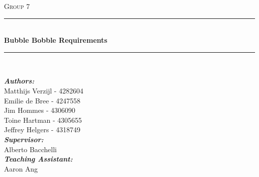\begin{titlepage}

\newcommand{\HRule}{\rule{\linewidth}{0.5mm}} %

\center %
 

\textsc{\LARGE Group 7}\\[1.5cm] %


\HRule \\[0.4cm]
{ \huge \bfseries Bubble Bobble Requirements}\\[0.4cm] %
\HRule \\[4cm]
 

\begin{minipage}{0.5\textwidth}
\begin{flushleft} \large
\textbf{\emph{Authors:}}\\     
Matthijs Verzijl - 4282604\\
Emilie de Bree - 4247558\\
Jim Hommes - 4306090\\
Toine Hartman - 4305655\\
Jeffrey Helgers - 4318749\\
\textbf{\emph{Supervisor:}} \\
Alberto Bacchelli\\
\textbf{\emph{Teaching Assistant:}} \\
Aaron Ang\\
\end{flushleft}
\end{minipage}\\[5cm]





\end{titlepage}
